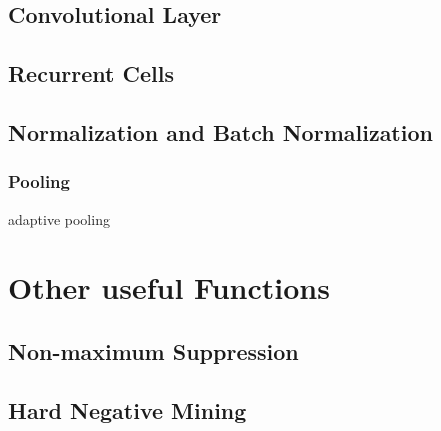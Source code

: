 \subsection{Convolutional Layer}
\subsection{Recurrent Cells}
\subsection{Normalization and Batch Normalization}
\subsubsection{Pooling}
adaptive pooling

\section{Other useful Functions}
\subsection{Non-maximum Suppression}
\subsection{Hard Negative Mining}
